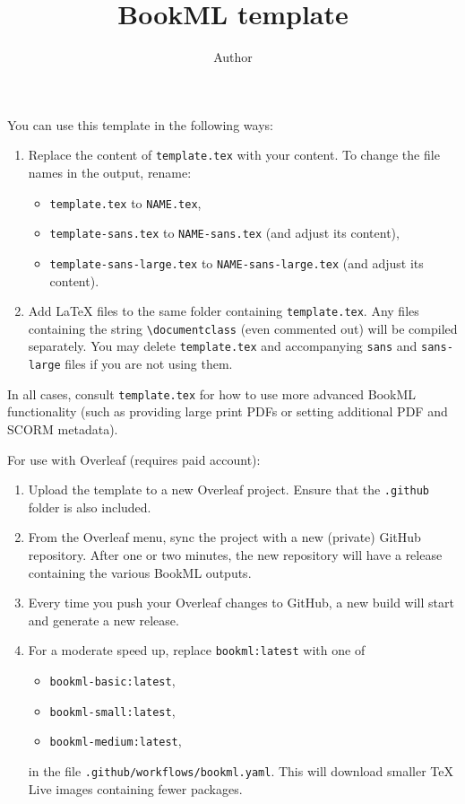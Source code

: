 \documentclass[oneside,11pt]{amsart}
\title{BookML template}
\author{Author}
\begin{document}
\maketitle

You can use this template in the following ways:
\begin{enumerate}
  \item Replace the content of \texttt{template.tex} with your content. To change the file names in the output, rename:
  \begin{itemize}
      \item \texttt{template.tex} to \texttt{NAME.tex},
      \item \texttt{template-sans.tex} to \texttt{NAME-sans.tex} (and adjust its content),
      \item \texttt{template-sans-large.tex} to \texttt{NAME-sans-large.tex} (and adjust its content).
  \end{itemize}
  \item Add \LaTeX{} files to the same folder containing \texttt{template.tex}. Any files containing the string \verb|\documentclass| (even commented out) will be compiled separately. You may delete \texttt{template.tex} and accompanying \texttt{sans} and \texttt{sans-large} files if you are not using them.
\end{enumerate}
In all cases, consult \texttt{template.tex} for how to use more advanced BookML functionality (such as providing large print PDFs or setting additional PDF and SCORM metadata).

\bigskip

For use with Overleaf (requires paid account):
\begin{enumerate}
  \item Upload the template to a new Overleaf project. Ensure that the \texttt{.github} folder is also included.
  \item From the Overleaf menu, sync the project with a new (private) GitHub repository. After one or two minutes, the new repository will have a release containing the various BookML outputs.
  \item Every time you push your Overleaf changes to GitHub, a new build will start and generate a new release.
  \item For a moderate speed up, replace \texttt{bookml:latest} with one of
  \begin{itemize}
      \item \texttt{bookml-basic:latest},
      \item \texttt{bookml-small:latest},
      \item \texttt{bookml-medium:latest},
  \end{itemize}
  in the file \texttt{.github/workflows/bookml.yaml}. This will download smaller \TeX{} Live images containing fewer packages.
\end{enumerate}
\end{document}
